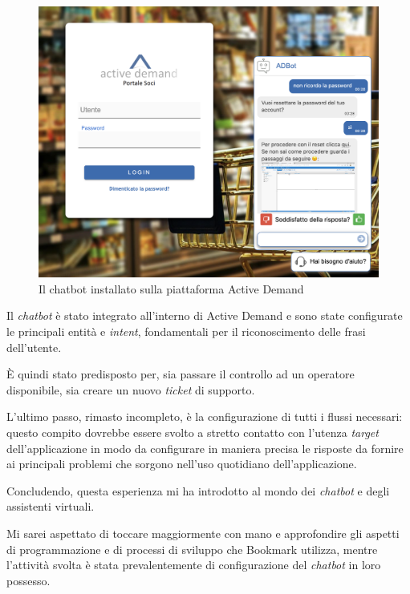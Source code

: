 \begin{figure}[h]
    \centering{}
    \includegraphics*[width=\textwidth]{./img/ad-login.png}
    \caption{Il chatbot installato sulla piattaforma Active Demand}
    \label{fig:ad-login}
\end{figure}

Il \textit{chatbot} è stato integrato all'interno di Active Demand e sono state configurate le principali entità e \textit{intent}, fondamentali per il riconoscimento delle frasi dell'utente.

\`E quindi stato predisposto per, sia passare il controllo ad un operatore disponibile, sia creare un nuovo \textit{ticket} di supporto.

L'ultimo passo, rimasto incompleto, è la configurazione di tutti i flussi necessari: questo compito dovrebbe essere svolto a stretto contatto con l'utenza \textit{target} dell'applicazione in modo da configurare in maniera precisa le risposte da fornire ai principali problemi che sorgono nell'uso quotidiano dell'applicazione.

Concludendo, questa esperienza mi ha introdotto al mondo dei \textit{chatbot} e degli assistenti virtuali. 

Mi sarei aspettato di toccare maggiormente con mano e approfondire gli aspetti di programmazione e di processi di sviluppo che Bookmark utilizza, mentre l'attività svolta è stata prevalentemente di configurazione del \textit{chatbot} in loro possesso.
